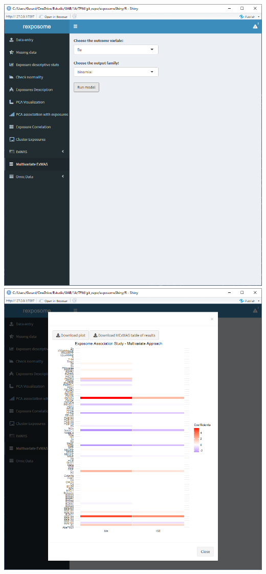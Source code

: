 \documentclass[
]{book}
\begin{document}
\includegraphics{images/analysis8_2.png} \includegraphics{images/analysis8_3.png}
\end{document}
